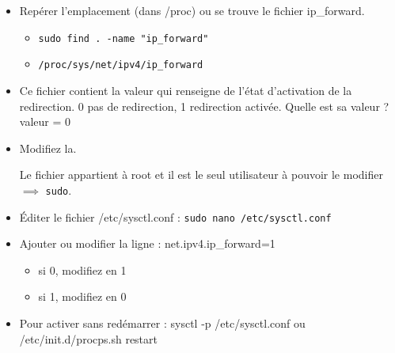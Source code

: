 \documentclass[a4paper]{article}
\begin{document}
\begin{itemize}

\item Repérer l’emplacement (dans /proc) ou se trouve le fichier ip\_forward.
\begin{example}
    \begin{itemize}
        \item \texttt{sudo find . -name "ip\_forward"}
        \item \texttt{/proc/sys/net/ipv4/ip\_forward}
    \end{itemize}
\end{example}

\item Ce fichier contient la valeur qui renseigne de l’état d’activation de la redirection. 0 pas de redirection, 1 redirection activée. Quelle est sa valeur ? valeur = 0

\item Modifiez la.
\begin{example}
    Le fichier appartient à root et il est le seul utilisateur à pouvoir le modifier $ \implies $ \texttt{sudo}.
\end{example}

\item Éditer le fichier /etc/sysctl.conf : \texttt{sudo nano /etc/sysctl.conf}

\item Ajouter ou modifier la ligne : net.ipv4.ip\_forward=1
\begin{itemize}
    \item si 0, modifiez en 1
    \item si 1, modifiez en 0
\end{itemize}

\item Pour activer sans redémarrer : sysctl -p /etc/sysctl.conf ou /etc/init.d/procps.sh restart


\end{itemize}
\end{document}
